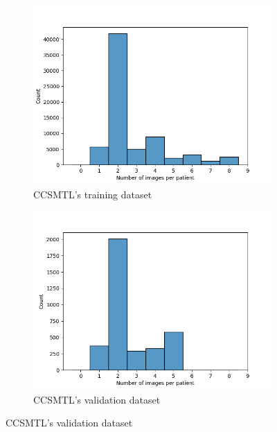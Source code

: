 \documentclass[11pt]{article}
\begin{document}
\begin{figure}[H]
     \centering
     \begin{subfigure}[b]{0.45\linewidth}
         \centering
         \includegraphics[width=\linewidth]{plots/image_count_ciusss_train}
         \caption{CCSMTL's training dataset}
         \vspace{4ex}
         \label{fig:count_image_ciusss_train}
     \end{subfigure}
     \hfill
     \begin{subfigure}[b]{0.45\linewidth}
         \centering
         \includegraphics[width=\linewidth]{plots/image_count_ciusss_valid}
         \caption{CCSMTL's validation dataset}
         \vspace{4ex}
         \label{fig:count_image_ciusss_valid}
     \end{subfigure}



\end{figure}
\end{document}
